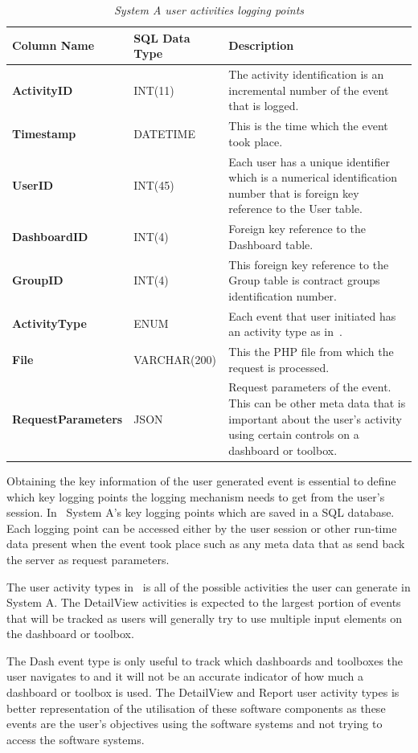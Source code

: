 \begin{table}[!htb]
	\centering
	\small
	\caption[System A user activities logging points]
	{\textit{System A user activities logging points}}
	\label{tbl:Ch2_System_A_Logging_Points}
	\begin{tabularx}{\textwidth}{|l|l|X|}
		\hline \textbf{Column Name} & \textbf{SQL Data Type} & \textbf{Description} \\
		\hline \textbf{ActivityID} & INT(11) & The activity identification is an incremental number of the event that is logged.\\
		\hline \textbf{Timestamp} & DATETIME & This is the time which the event took place.\\
		\hline \textbf{UserID} & INT(45) & Each user has a unique identifier which is a numerical identification number that is foreign key reference to the User table.\\
		\hline \textbf{DashboardID} & INT(4) & Foreign key reference to the Dashboard table. \\
		\hline \textbf{GroupID} & INT(4) & This foreign key reference to the Group table is contract groups identification number. \\ 		
		\hline \textbf{ActivityType} & ENUM & Each event that user initiated has an activity type as in~\Cref{tbl:Ch2_SystemA_EventTypes}. \\
		\hline \textbf{File} & VARCHAR(200) & This the PHP file from which the request is processed.\\
		\hline \textbf{RequestParameters} & JSON & Request parameters of the event. This can be other meta data that is important about the user's activity using certain controls on a dashboard or toolbox. \\
		\hline
	\end{tabularx}
\end{table}

\clearpage

Obtaining the key information of the user generated event is essential to define which key logging points the logging mechanism needs to get from the user's session. In~ System A's key logging points which are saved in a SQL database. Each logging point can be accessed either by the user session or other run-time data present when the event took place such as any meta data that as send back the server as request parameters.

The user activity types in~ is all of the possible activities the user can generate in System A. The DetailView activities is expected to the largest portion of events that will be tracked as users will generally try to use multiple input elements on the dashboard or toolbox. \par The Dash event type is only useful to track which dashboards and toolboxes the user navigates to and it will not be an accurate indicator of how much a dashboard or toolbox is used. The DetailView and Report user activity types is better representation of the utilisation of these software components as these events are the user's objectives using the software systems and not trying to access the software systems.  

